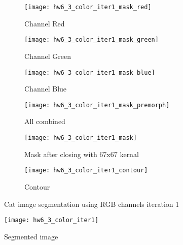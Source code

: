 \documentclass[11pt]{article}
\begin{document}
\begin{figure}[H]
\begin{subfigure}{.5\textwidth}
  \centering
  \texttt{[image: hw6\_3\_color\_iter1\_mask\_red]}
  \caption{Channel Red}
  \label{}
\end{subfigure}
\begin{subfigure}{.5\textwidth}
  \centering
  \texttt{[image: hw6\_3\_color\_iter1\_mask\_green]}
  \caption{Channel Green}
  \label{}
\end{subfigure}

\begin{subfigure}{.5\textwidth}
  \centering
  \texttt{[image: hw6\_3\_color\_iter1\_mask\_blue]}
  \caption{Channel Blue}
  \label{}
\end{subfigure}
\begin{subfigure}{.5\textwidth}
  \centering
  \texttt{[image: hw6\_3\_color\_iter1\_mask\_premorph]}
  \caption{All combined}
  \label{}
\end{subfigure}

\begin{subfigure}{.5\textwidth}
  \centering
  \texttt{[image: hw6\_3\_color\_iter1\_mask]}
  \caption{Mask after closing with 67x67 kernal}
  \label{}
\end{subfigure}
\begin{subfigure}{.5\textwidth}
  \centering
  \texttt{[image: hw6\_3\_color\_iter1\_contour]}
  \caption{Contour}
  \label{}
\end{subfigure}

\caption{Cat image segmentation using RGB channels iteration 1}
\label{}
\end{figure}


\begin{figure}[H]
\centering
\texttt{[image: hw6\_3\_color\_iter1]}
\caption{Segmented image}
\label{}
\end{figure}
\end{document}
